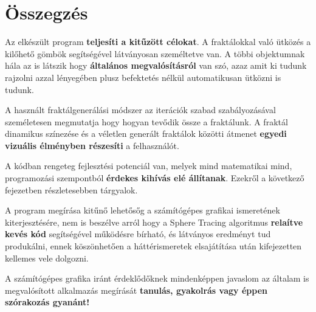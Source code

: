 \chapter{Összegzés} %
\label{ch:sum}

Az elkészült program \textbf{teljesíti a kitűzött célokat}. A fraktálokkal való ütközés a kilőhető gömbök segítségével látványosan személtetve van. A többi objektumnak hála az is látszik hogy \textbf{általános megvalósításról} van szó, azaz amit ki tudunk rajzolni azzal lényegében plusz befektetés nélkül automatikusan ütközni is tudunk. 

A használt fraktálgenerálási módszer az iterációk szabad szabályozásával személetesen megmutatja hogy hogyan tevődik össze a fraktálunk. A fraktál dinamikus színezése és a véletlen generált fraktálok közötti átmenet \textbf{egyedi vizuális élményben részesíti} a felhasználót.

A kódban rengeteg fejlesztési potenciál van, melyek mind matematikai mind, programozási szempontból\textbf{ érdekes kihívás elé állítanak}. Ezekről a következő fejezetben részletesebben tárgyalok.

A program megírása kitűnő lehetősőg a számítógépes grafikai ismeretének kiterjesztésére, nem is beszélve arról hogy a Sphere Tracing algoritmus \textbf{relaítve kevés kód} segítségével működésre bírható, és látványos eredményt tud produkálni, ennek köszönhetően a háttérismeretek elsajátítása után kifejezetten kellemes vele dolgozni. 

A számítógépes grafika iránt érdeklődőknek mindenképpen javaslom az általam is megvalósított alkalmazás megírását \textbf{tanulás, gyakolrás vagy éppen szórakozás gyanánt!}